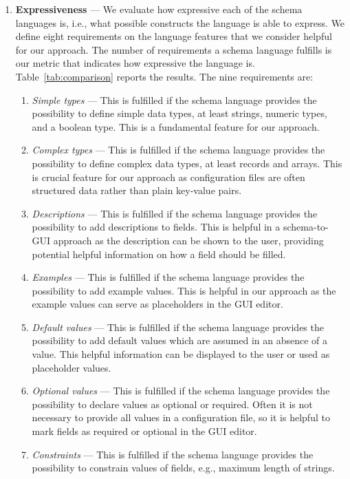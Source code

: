 \begin{enumerate}
    \item \textbf{Expressiveness} --- We evaluate how expressive each of the schema languages is, i.e., what possible constructs the language is able to express.
    We define eight requirements on the language features that we consider helpful for our approach.
    The number of requirements a schema language fulfills is our metric that indicates how expressive the language is.
    Table~\ref{tab:comparison} reports the results.
    The nine requirements are:
    \begin{enumerate}
        \item \textit{Simple types} --- This is fulfilled if the schema language provides the possibility to define simple data types, at least strings, numeric types, and a boolean type.
        This is a fundamental feature for our approach.
        \item \textit{Complex types} --- This is fulfilled if the schema language provides the possibility to define complex data types, at least records and arrays.
        This is crucial feature for our approach as configuration files are often structured data rather than plain key-value pairs.
        \item \textit{Descriptions} --- This is fulfilled if the schema language provides the possibility to add descriptions to fields.
        This is helpful in a schema-to-GUI approach as the description can be shown to the user, providing potential helpful information on how a field should be filled.
        \item \textit{Examples} --- This is fulfilled if the schema language provides the possibility to add example values.
        This is helpful in our approach as the example values can serve as placeholders in the GUI editor.
        \item \textit{Default values} --- This is fulfilled if the schema language provides the possibility to add default values which are assumed in an absence of a value.
        This helpful information can be displayed to the user or used as placeholder values.
        \item \textit{Optional values} --- This is fulfilled if the schema language provides the possibility to declare values as optional or required.
        Often it is not necessary to provide all values in a configuration file, so it is helpful to mark fields as required or optional in the GUI editor.
        \item \textit{Constraints} --- This is fulfilled if the schema language provides the possibility to constrain values of fields, e.g., maximum length of strings.

\end{enumerate}
\end{enumerate}
